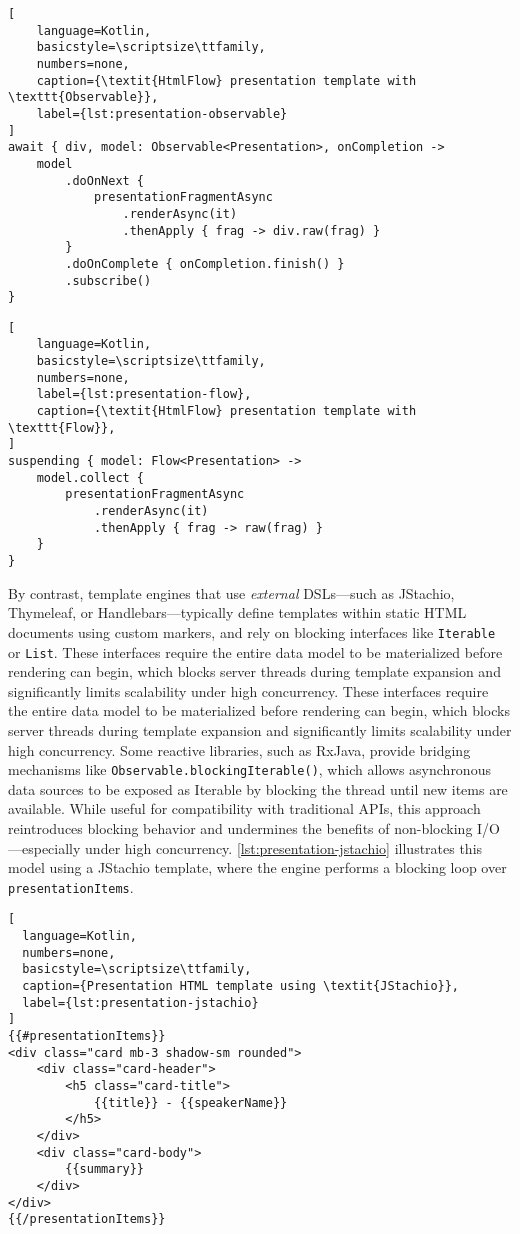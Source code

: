 \lstset{style=listingstyle}
\begin{lstlisting}[
    language=Kotlin,
    basicstyle=\scriptsize\ttfamily,
    numbers=none,
    caption={\textit{HtmlFlow} presentation template with \texttt{Observable}},
    label={lst:presentation-observable}
]
await { div, model: Observable<Presentation>, onCompletion ->
    model
        .doOnNext { 
            presentationFragmentAsync
                .renderAsync(it)
                .thenApply { frag -> div.raw(frag) }
        }
        .doOnComplete { onCompletion.finish() }
        .subscribe()
}
\end{lstlisting}
\hfil
\begin{lstlisting}[
    language=Kotlin,
    basicstyle=\scriptsize\ttfamily,
    numbers=none,
    label={lst:presentation-flow},
    caption={\textit{HtmlFlow} presentation template with \texttt{Flow}},
]
suspending { model: Flow<Presentation> ->
    model.collect {
        presentationFragmentAsync
            .renderAsync(it)
            .thenApply { frag -> raw(frag) }
    }
}
\end{lstlisting}

By contrast, template engines that use \textit{external} DSLs—such as JStachio,
Thymeleaf, or Handlebars—typically define templates within static HTML
documents using custom markers, and rely on blocking interfaces like
\texttt{Iterable} or \texttt{List}. These interfaces require the entire data
model to be materialized before rendering can begin, which blocks server
threads during template expansion and significantly limits scalability under
high concurrency. These interfaces require the entire data model to be
materialized before rendering can begin, which blocks server threads during
template expansion and significantly limits scalability under high concurrency.
Some reactive libraries, such as RxJava, provide bridging mechanisms like
\texttt{Observable.blockingIterable()}, which allows asynchronous data sources
to be exposed as Iterable by blocking the thread until new items are available.
While useful for compatibility with traditional APIs, this approach
reintroduces blocking behavior and undermines the benefits of non-blocking
I/O—especially under high concurrency. \autoref{lst:presentation-jstachio}
illustrates this model using a JStachio template, where the engine performs a
blocking loop over \texttt{presentationItems}.

\vspace{1cm}

\lstset{style=listingstyle}
\begin{lstlisting}[
  language=Kotlin,
  numbers=none,
  basicstyle=\scriptsize\ttfamily,
  caption={Presentation HTML template using \textit{JStachio}},
  label={lst:presentation-jstachio}
]
{{#presentationItems}}
<div class="card mb-3 shadow-sm rounded">
    <div class="card-header">
        <h5 class="card-title">
            {{title}} - {{speakerName}}
        </h5>
    </div>
    <div class="card-body">
        {{summary}}
    </div>
</div>
{{/presentationItems}}
\end{lstlisting}

